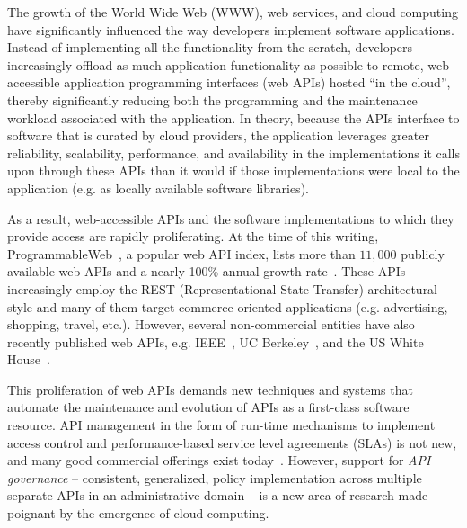 The growth of the World Wide Web (WWW), web services, and cloud computing have
significantly influenced the way developers implement software applications.
Instead of implementing all the functionality from the scratch, developers
increasingly offload as much application functionality as possible to remote,
web-accessible application programming interfaces (web APIs) hosted ``in the
cloud'', thereby significantly reducing both the programming and
the maintenance workload associated with the application.  In theory, because
the APIs interface to software that is curated by cloud providers, the
application leverages greater
reliability, scalability, performance, 
and availability in the implementations it calls upon through these APIs than
it would if those implementations were local to the application
(e.g. as locally available software libraries).

As a result, web-accessible APIs and the software implementations to which
they provide access are rapidly proliferating.
At the time of this writing, 
ProgrammableWeb~\cite{pweb}, a popular web API index, lists more than $11,000$
publicly available
web APIs and a nearly 100\% annual growth rate~\cite{pweb_growth}. 
These APIs increasingly employ the REST (Representational State Transfer) architectural style and 
many of them target commerce-oriented applications (e.g.
advertising, shopping, travel, etc.).
However, several non-commercial entities have also recently
published web 
APIs, e.g. IEEE~\cite{ieeeapis}, UC Berkeley~\cite{ucbapis}, and the US White
House~\cite{whitehouseapis}. 

This proliferation of web APIs demands new techniques and systems that
automate the maintenance and evolution of APIs as a first-class software
resource.  API management in the form of run-time mechanisms to implement
access control and performance-based service level agreements (SLAs) is not
new, and many good commercial offerings exist today~\cite{3scale,apigee,layer7}.   
However, support for \textit{API governance} -- consistent, generalized, policy
implementation across multiple separate APIs in an administrative domain --
is a new area of research made poignant by the emergence of cloud computing.

